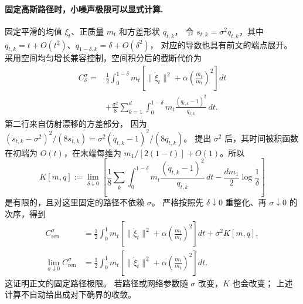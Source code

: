 \documentclass[UTF8,a4paper,11pt,fontset=fandol]{ctexart}
\begin{document}
\paragraph{固定高斯路径时，小噪声极限可以显式计算.}
固定平滑的均值 $\xi_t$、正质量 $m_t$ 和方差形状 $q_{t,k}$，
令 $s_{t,k}=\sigma^2q_{t,k}$，其中
$q_{t,k}=t+O(t^2)$、$q_{1-\delta,k}=\delta+O(\delta^2)$，
对应的导数也具有前文的端点展开。
采用空间均匀增长兼容控制，空间积分后的截断代价为
\begin{equation}
\begin{aligned}
C_\delta^\sigma
={}&\frac12\int_0^{1-\delta}m_t
\left[\|\dot\xi_t\|^2
+\alpha\left(\frac{\dot m_t}{m_t}\right)^2\right]dt\\
&+\frac{\sigma^2}{8}\sum_{k=1}^d
\int_0^{1-\delta}m_t\frac{(\dot q_{t,k}-1)^2}{q_{t,k}}\,dt.
\end{aligned}
\end{equation}
第二行来自仿射漂移的方差部分，
因为 $(\dot s_{t,k}-\sigma^2)^2/(8s_{t,k})
=\sigma^2(\dot q_{t,k}-1)^2/(8q_{t,k})$。
提出 $\sigma^2$ 后，其时间被积函数在初端为 $O(t)$，在末端每维为
$m_1/[2(1-t)]+O(1)$。所以
\begin{equation}
K[m,q]:=\lim_{\delta\downarrow0}
\left[\frac18\sum_k\int_0^{1-\delta}
m_t\frac{(\dot q_{t,k}-1)^2}{q_{t,k}}\,dt
-\frac{dm_1}{2}\log\frac1\delta\right]
\end{equation}
是有限的，且对这里固定的路径不依赖 $\sigma$。
严格按照先 $\delta\downarrow0$ 重整化、再 $\sigma\downarrow0$ 的次序，得到
\begin{equation}
\begin{aligned}
C_{\mathrm{ren}}^\sigma
&=\frac12\int_0^1m_t
\left[\|\dot\xi_t\|^2
+\alpha\left(\frac{\dot m_t}{m_t}\right)^2\right]dt+\sigma^2K[m,q],\\
\lim_{\sigma\downarrow0}C_{\mathrm{ren}}^\sigma
&=\frac12\int_0^1m_t
\left[\|\dot\xi_t\|^2
+\alpha\left(\frac{\dot m_t}{m_t}\right)^2\right]dt.
\end{aligned}
\label{eq:fixed-gaussian-zero-noise-calculation}
\end{equation}
这证明正文的固定路径极限。
若路径或网络参数随 $\sigma$ 改变，$K$ 也会改变；
上述计算不自动给出成对下确界的收敛。
\end{document}
